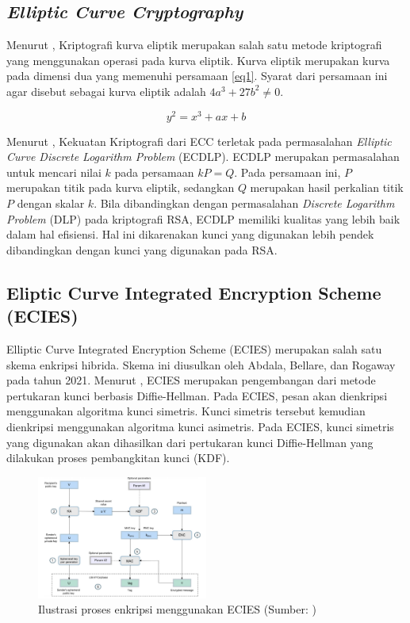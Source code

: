 \documentclass[conference]{IEEEtran}
\begin{document}
\subsection{\emph{Elliptic Curve Cryptography}}
Menurut \cite{munir2019}, Kriptografi kurva eliptik merupakan salah satu metode kriptografi yang menggunakan operasi pada kurva eliptik. Kurva eliptik merupakan kurva pada dimensi dua yang memenuhi persamaan \ref{eq1}. Syarat dari persamaan ini agar disebut sebagai kurva eliptik adalah $4a^3 + 27b^2 \neq 0$.

\begin{equation}
    \label{eq1}
    y^2 = x^3 + ax + b
\end{equation}

Menurut \cite{ali2016}, Kekuatan Kriptografi dari ECC terletak pada permasalahan \emph{Elliptic Curve Discrete Logarithm Problem} (ECDLP). ECDLP merupakan permasalahan untuk mencari nilai $k$ pada persamaan $kP = Q$. Pada persamaan ini, $P$ merupakan titik pada kurva eliptik, sedangkan $Q$ merupakan hasil perkalian titik $P$ dengan skalar $k$. Bila dibandingkan dengan permasalahan \emph{Discrete Logarithm Problem} (DLP) pada kriptografi RSA, ECDLP memiliki kualitas yang lebih baik dalam hal efisiensi. Hal ini dikarenakan kunci yang digunakan lebih pendek dibandingkan dengan kunci yang digunakan pada RSA.

\subsection{Eliptic Curve Integrated Encryption Scheme (ECIES)}
\label{sec:ecies}

Elliptic Curve Integrated Encryption Scheme (ECIES) merupakan salah satu skema enkripsi hibrida. Skema ini diusulkan oleh Abdala, Bellare, dan Rogaway pada tahun 2021. Menurut \cite{abdalla2021}, ECIES merupakan pengembangan dari metode pertukaran kunci berbasis Diffie-Hellman. Pada ECIES, pesan akan dienkripsi menggunakan algoritma kunci simetris. Kunci simetris tersebut kemudian dienkripsi menggunakan algoritma kunci asimetris. Pada ECIES, kunci simetris yang digunakan akan dihasilkan dari pertukaran kunci Diffie-Hellman yang dilakukan proses pembangkitan kunci (KDF). 

\begin{figure}[htbp]
    \centerline{\includegraphics[width=0.5\textwidth]{res/ecies.png}}
    \caption{Ilustrasi proses enkripsi menggunakan ECIES (Sumber: \cite{martinez2010})}
    \label{fig:ecies}
\end{figure}
\end{document}
